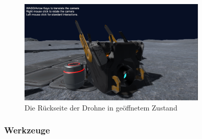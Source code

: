 \begin{figure}[H]
\centering
\includegraphics[width=0.8\textwidth]{DrohneOffen.PNG}
\caption{Die Rückseite der Drohne in geöffnetem Zustand}
\end{figure}

\subsubsection{Werkzeuge}

